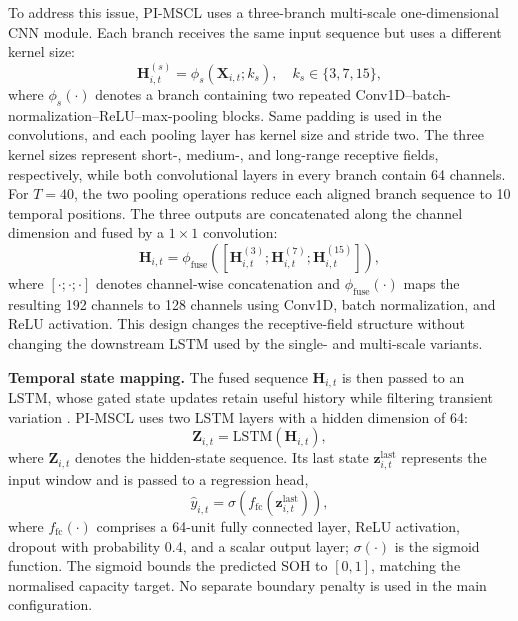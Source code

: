\documentclass[pdflatex,sn-mathphys-num]{sn-jnl}
\begin{document}
To address this issue, PI-MSCL uses a three-branch multi-scale one-dimensional CNN module. Each branch receives the same input sequence but uses a different kernel size:
\begin{equation}
\mathbf{H}^{(s)}_{i,t}=\phi_{s}\left(\mathbf{X}_{i,t};k_s\right),
\quad k_s\in\{3,7,15\},
\label{eq:multiscale_branch}
\end{equation}
where $\phi_s(\cdot)$ denotes a branch containing two repeated Conv1D--batch-normalization--ReLU--max-pooling blocks. Same padding is used in the convolutions, and each pooling layer has kernel size and stride two. The three kernel sizes represent short-, medium-, and long-range receptive fields, respectively, while both convolutional layers in every branch contain 64 channels. For $T=40$, the two pooling operations reduce each aligned branch sequence to 10 temporal positions. The three outputs are concatenated along the channel dimension and fused by a $1\times1$ convolution:
\begin{equation}
\mathbf{H}_{i,t}=\phi_{\mathrm{fuse}}\left(
\left[\mathbf{H}^{(3)}_{i,t};\mathbf{H}^{(7)}_{i,t};\mathbf{H}^{(15)}_{i,t}\right]
\right),
\label{eq:multiscale_fusion}
\end{equation}
where $[\cdot;\cdot;\cdot]$ denotes channel-wise concatenation and $\phi_{\mathrm{fuse}}(\cdot)$ maps the resulting 192 channels to 128 channels using Conv1D, batch normalization, and ReLU activation. This design changes the receptive-field structure without changing the downstream LSTM used by the single- and multi-scale variants.

\noindent\textbf{Temporal state mapping.}
The fused sequence $\mathbf{H}_{i,t}$ is then passed to an LSTM, whose gated state updates retain useful history while filtering transient variation \cite{hochreiter1997long}. PI-MSCL uses two LSTM layers with a hidden dimension of 64:
\begin{equation}
\mathbf{Z}_{i,t}=\mathrm{LSTM}\left(\mathbf{H}_{i,t}\right),
\label{eq:lstm_sequence}
\end{equation}
where $\mathbf{Z}_{i,t}$ denotes the hidden-state sequence. Its last state $\mathbf{z}_{i,t}^{\mathrm{last}}$ represents the input window and is passed to a regression head,
\begin{equation}
\hat{y}_{i,t}=\sigma\left(f_{\mathrm{fc}}\left(\mathbf{z}_{i,t}^{\mathrm{last}}\right)\right),
\label{eq:soh_regression}
\end{equation}
where $f_{\mathrm{fc}}(\cdot)$ comprises a 64-unit fully connected layer, ReLU activation, dropout with probability 0.4, and a scalar output layer; $\sigma(\cdot)$ is the sigmoid function. The sigmoid bounds the predicted SOH to $[0,1]$, matching the normalised capacity target. No separate boundary penalty is used in the main configuration.
\end{document}
